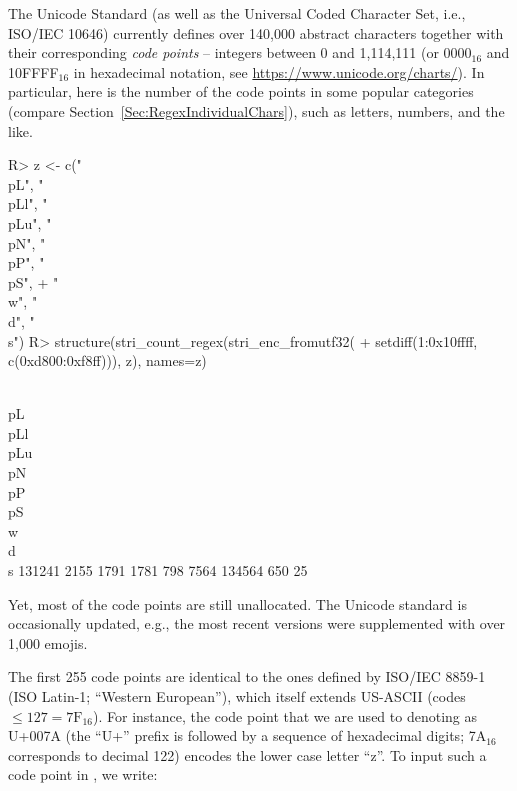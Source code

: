 \documentclass[nojss]{jss}
\begin{document}
The Unicode Standard (as well as the
Universal Coded Character Set, i.e., ISO/IEC 10646)
currently defines over 140{,}000 abstract characters together with
their corresponding \textit{code points} -- integers
between 0 and 1{,}114{,}111 (or 0000${}_{16}$ and 10FFFF${}_{16}$
in hexadecimal notation, see \url{https://www.unicode.org/charts/}).
In particular, here is the number of the code points in
some popular categories (compare Section~\ref{Sec:RegexIndividualChars}),
such as letters, numbers, and the like.

\begin{Schunk}
\begin{Sinput}
R> z <- c("\\p{L}", "\\p{Ll}", "\\p{Lu}", "\\p{N}", "\\p{P}", "\\p{S}",
+    "\\w", "\\d", "\\s")
R> structure(stri_count_regex(stri_enc_fromutf32(
+    setdiff(1:0x10ffff, c(0xd800:0xf8ff))), z), names=z)
\end{Sinput}
\begin{Soutput}
 \\p{L} \\p{Ll} \\p{Lu}  \\p{N}  \\p{P}  \\p{S}     \\w     \\d     \\s
 131241    2155    1791    1781     798    7564  134564     650      25
\end{Soutput}
\end{Schunk}

Yet, most of the code points are still unallocated.
The Unicode standard is occasionally updated, e.g., the
most recent versions were supplemented with over 1{,}000 emojis.


The first 255 code points are identical to the ones defined
by ISO/IEC 8859-1 (ISO Latin-1;
``Western European''), which itself extends US-ASCII (codes $\le 127=\text{7F}{}_{16}$).
For instance, the code point that we are used to denoting as U+007A
(the ``U+'' prefix is followed by a sequence of hexadecimal digits;
7A${}_{16}$ corresponds to decimal 122) encodes the lower case letter ``z''.
To input such a code point in , we write:
\end{document}

